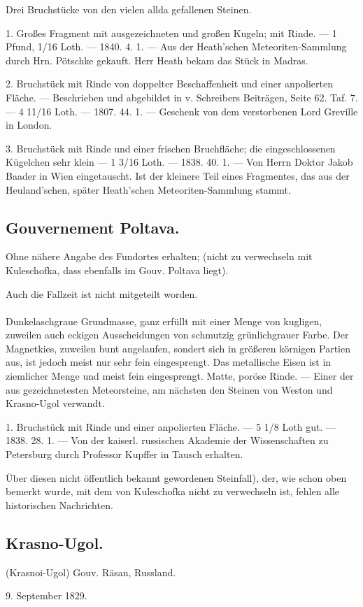 \documentclass[a4paper, 11pt, oneside, polutonikogreek, german]{article}
\begin{document}
Drei Bruchstücke von den vielen allda gefallenen Steinen.

1. Großes Fragment mit ausgezeichneten und großen Kugeln; mit Rinde. — 1 Pfund, 1/16 Loth. — 1840. 4. 1. — Aus der Heath'schen Meteoriten-Sammlung durch Hrn. Pötschke gekauft. Herr Heath bekam das Stück in Madras.

2. Bruchstück mit Rinde von doppelter Beschaffenheit und einer anpolierten Fläche. — Beschrieben und abgebildet in v. Schreibers Beiträgen, Seite 62. Taf. 7. — 4 11/16 Loth. — 1807. 44. 1. — Geschenk von dem verstorbenen Lord Greville in London.

3. Bruchstück mit Rinde und einer frischen Bruchfläche; die eingeschlossenen Kügelchen sehr klein — 1 3/16 Loth. — 1838. 40. 1. — Von Herrn Doktor Jakob Baader in Wien eingetauscht. Ist der kleinere Teil eines Fragmentes, das aus der Heuland'schen, später Heath'schen Meteoriten-Sammlung stammt.
\subsection{Gouvernement Poltava.}
\begin{center}
\small
Ohne nähere Angabe des Fundortes erhalten; (nicht zu verwechseln mit Kuleschofka, dass ebenfalls im Gouv. Poltava liegt).

Auch die Fallzeit ist nicht mitgeteilt worden.
\end{center}
\paragraph{}
Dunkelaschgraue Grundmasse, ganz erfüllt mit einer Menge von kugligen, zuweilen auch eckigen Ausscheidungen von schmutzig grünlichgrauer Farbe. Der Magnetkies, zuweilen bunt angelaufen, sondert sich in größeren körnigen Partien aus, ist jedoch meist nur sehr fein eingesprengt. Das metallische Eisen ist in ziemlicher Menge und meist fein eingesprengt. Matte, poröse Rinde. — Einer der aus gezeichnetesten Meteorsteine‚ am nächsten den Steinen von Weston und Krasno-Ugol verwandt.

1. Bruchstück mit Rinde und einer anpolierten Fläche. — 5 1/8 Loth gut. — 1838. 28. 1. — Von der kaiserl. russischen Akademie der Wissenschaften zu Petersburg durch Professor Kupffer in Tausch erhalten.

Über diesen nicht öffentlich bekannt gewordenen Steinfall), der, wie schon oben bemerkt wurde, mit dem von Kuleschofka nicht zu verwechseln ist, fehlen alle historischen Nachrichten.
\subsection{Krasno-Ugol.}
\begin{center}
\small
(Krasnoi-Ugol) Gouv. Räsan, Russland.

9. September 1829.
\end{center}
\end{document}
